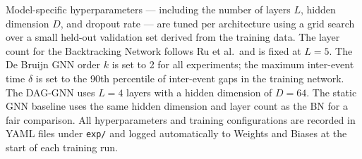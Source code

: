 Model-specific hyperparameters --- including the number of layers $L$, hidden dimension $D$, and dropout rate --- are tuned per architecture using a grid search over a small held-out validation set derived from the training data. The layer count for the Backtracking Network follows Ru et al.\ and is fixed at $L = 5$. The De Bruijn GNN order $k$ is set to 2 for all experiments; the maximum inter-event time $\delta$ is set to the 90th percentile of inter-event gaps in the training network. The DAG-GNN uses $L = 4$ layers with a hidden dimension of $D = 64$. The static GNN baseline uses the same hidden dimension and layer count as the BN for a fair comparison. All hyperparameters and training configurations are recorded in YAML files under \texttt{exp/} and logged automatically to Weights and Biases at the start of each training run.


